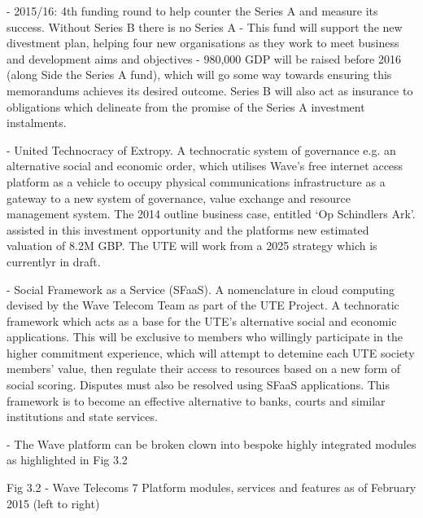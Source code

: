 \documentclass[letterpaper,10pt,openany,oneside,english]{sphinxmanual}
\begin{document}
 - 2015/16: 4th funding round to help counter the Series A and measure its success. Without Series B there is no Series A - This fund will support the new divestment plan, helping four new organisations as they work to meet business and development aims and objectives - 980,000 GDP will be raised before 2016 (along Side the Series A fund), which will go some way towards ensuring this memorandums achieves its desired outcome. Series B will also act as insurance to obligations which delineate from the promise of the Series A investment instalments.

 - United Technocracy of Extropy. A technocratic system of governance e.g. an alternative social and economic order, which utilises Wave’s free internet access platform as a vehicle to occupy physical communications infrastructure as a gateway to a new system of governance, value exchange and resource management system. The 2014 outline business case,  entitled ‘Op Schindlers Ark’. assisted in this investment opportunity and the platforms new estimated valuation of 8.2M GBP. The UTE will work from a 2025 strategy which is currentlyr in draft.

 - Social Framework as a Service (SFaaS). A nomenclature in cloud computing devised by the Wave Telecom Team as part of the UTE Project.
A technoratic framework which acts as a base for the UTE’s alternative social and economic applications. This will be exclusive to members who willingly participate in the higher commitment experience, which will attempt to detemine each UTE society members’ value, then regulate their access to resources based on a new form of social scoring. Disputes must also be resolved using SFaaS applications. This framework is to become an effective alternative to banks, courts and similar institutions and state services.

 - The Wave platform can be broken clown into bespoke highly integrated modules as highlighted in Fig 3.2

Fig 3.2 - Wave Telecoms 7 Platform modules, services and features as of February 2015 (left to right)

\noindent{}
\end{document}
